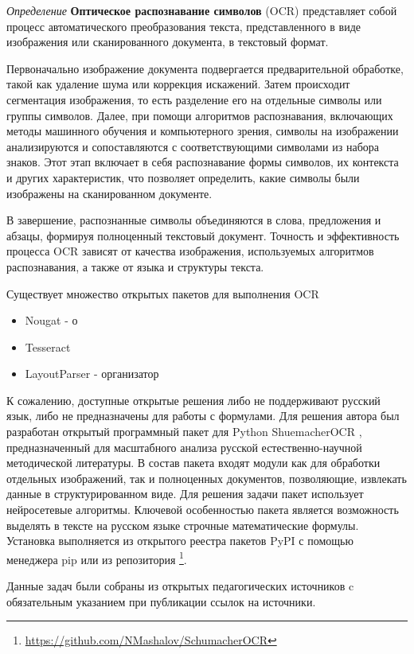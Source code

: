 \textit{Определение} \textbf{Оптическое распознавание символов} (OCR) представляет собой процесс автоматического преобразования текста,
 представленного в виде изображения или сканированного документа, в текстовый формат.
 
Первоначально изображение документа подвергается предварительной обработке, такой как удаление шума или коррекция искажений. 
Затем происходит сегментация изображения, то есть разделение его на отдельные символы или группы символов.
Далее, при помощи алгоритмов распознавания, включающих методы машинного обучения и компьютерного зрения, 
символы на изображении анализируются и сопоставляются с соответствующими символами из набора знаков. Этот этап включает в себя распознавание формы символов, их контекста и других характеристик, что позволяет определить, какие символы были изображены на сканированном документе.

В завершение, распознанные символы объединяются в слова, предложения и абзацы, формируя полноценный текстовый документ. 
Точность и эффективность процесса OCR зависят от качества изображения, используемых алгоритмов распознавания, а также от языка и структуры текста.

Существует множество открытых пакетов для выполнения OCR \begin{itemize}
    \item Nougat - о  \cite{blecher2023nougat}
    \item Tesseract \cite{smith2007overview}
    \item LayoutParser - организатор  \cite{shen2021layoutparser}
\end{itemize}

К сожалению, доступные открытые решения либо не поддерживают русский язык, либо не предназначены для работы с формулами.
Для решения автора был разработан открытый программный пакет для Python ShuemacherOCR
, предназначенный для масштабного анализа русской естественно-научной методической литературы.
В состав пакета входят модули как для обработки отдельных изображений, 
так и полноценных документов, позволяющие, извлекать данные в структурированном виде. 
Для решения задачи пакет использует нейросетевые алгоритмы. 
Ключевой особенностью пакета  является возможность выделять в тексте на русском языке строчные математические формулы.
Установка выполняется из открытого реестра пакетов PyPI с помощью менеджера pip или
из репозитория \footnote{\url{https://github.com/NMashalov/SchumacherOCR}}. 

Данные задач были собраны из открытых педагогических источников \cite{libmipt}\cite{mathedu} 
c обязательным указанием при публикации ссылок на источники.

